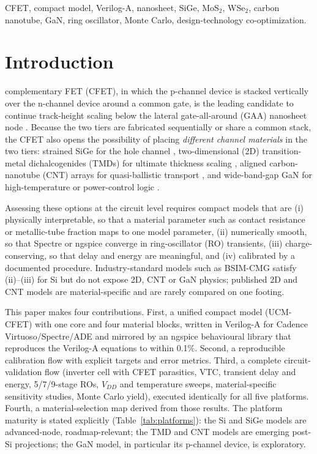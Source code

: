 \documentclass[journal]{IEEEtran}
\newcommand{\ucm}{UCM-CFET}
\begin{document}
\begin{IEEEkeywords}
CFET, compact model, Verilog-A, nanosheet, SiGe, MoS$_2$, WSe$_2$, carbon nanotube, GaN, ring oscillator, Monte Carlo, design-technology co-optimization.
\end{IEEEkeywords}

\section{Introduction}
 complementary FET (CFET), in which the p-channel device is stacked vertically over the n-channel device around a common gate, is the leading candidate to continue track-height scaling below the lateral gate-all-around (GAA) nanosheet node \cite{Ryckaert2018,Subramanian2020,Huang2020}. Because the two tiers are fabricated sequentially or share a common stack, the CFET also opens the possibility of placing \emph{different channel materials} in the two tiers: strained SiGe for the hole channel \cite{Mertens2016,Mochizuki2020}, two-dimensional (2D) transition-metal dichalcogenides (TMDs) for ultimate thickness scaling \cite{OBrien2021,OBrien2023,Li2023Nature,Shen2021,Chou2022}, aligned carbon-nanotube (CNT) arrays for quasi-ballistic transport \cite{Liu2020Science,Hills2019,Shulaker2017}, and wide-band-gap GaN for high-temperature or power-control logic \cite{Bader2020,Zheng2021,Chowdhury2020,Amano2018}.

Assessing these options at the circuit level requires compact models that are (i) physically interpretable, so that a material parameter such as contact resistance or metallic-tube fraction maps to one model parameter, (ii) numerically smooth, so that Spectre or ngspice converge in ring-oscillator (RO) transients, (iii) charge-conserving, so that delay and energy are meaningful, and (iv) calibrated by a documented procedure. Industry-standard models such as BSIM-CMG \cite{Chauhan2015} satisfy (ii)--(iii) for Si but do not expose 2D, CNT or GaN physics; published 2D \cite{Pasadas2019} and CNT \cite{Deng2007} models are material-specific and are rarely compared on one footing.

This paper makes four contributions. First, a unified compact model (\ucm) with one core and four material blocks, written in Verilog-A for Cadence Virtuoso/Spectre/ADE \cite{CadenceVerilogA,CadenceSpectre,Cadence2024Training} and mirrored by an ngspice behavioural library \cite{Ngspice} that reproduces the Verilog-A equations to within 0.1\%. Second, a reproducible calibration flow with explicit targets and error metrics. Third, a complete circuit-validation flow (inverter cell with CFET parasitics, VTC, transient delay and energy, 5/7/9-stage ROs, $V_{DD}$ and temperature sweeps, material-specific sensitivity studies, Monte Carlo yield), executed identically for all five platforms. Fourth, a material-selection map derived from those results. The platform maturity is stated explicitly (Table~\ref{tab:platforms}): the Si and SiGe models are advanced-node, roadmap-relevant; the TMD and CNT models are emerging post-Si projections; the GaN model, in particular its p-channel device, is exploratory.
\end{document}
